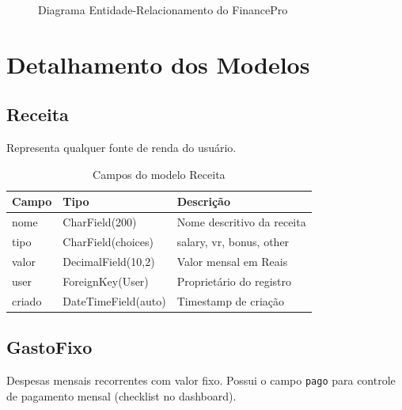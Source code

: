\documentclass[12pt, a4paper, oneside]{report}
\begin{document}
\begin{figure}[H]
\caption{Diagrama Entidade-Relacionamento do FinancePro}
\end{figure}

\section{Detalhamento dos Modelos}

\subsection{Receita}

Representa qualquer fonte de renda do usuário.

\begin{table}[H]
\centering
\caption{Campos do modelo Receita}
\begin{tabularx}{\textwidth}{>{\ttfamily}l l X}
\toprule
Campo & Tipo & Descrição \\
\midrule
nome & CharField(200) & Nome descritivo da receita \\
tipo & CharField(choices) & salary, vr, bonus, other \\
valor & DecimalField(10,2) & Valor mensal em Reais \\
user & ForeignKey(User) & Proprietário do registro \\
criado & DateTimeField(auto) & Timestamp de criação \\
\bottomrule
\end{tabularx}
\end{table}

\subsection{GastoFixo}

Despesas mensais recorrentes com valor fixo. Possui o campo \texttt{pago} para controle de pagamento mensal (checklist no dashboard).
\end{document}
